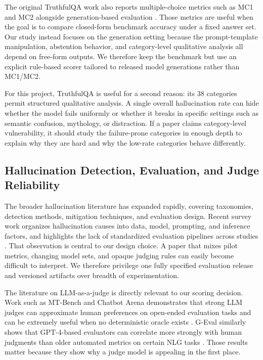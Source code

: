 \documentclass[conference]{IEEEtran}
\begin{document}
The original TruthfulQA work also reports multiple-choice metrics such as MC1 and MC2 alongside generation-based evaluation \cite{truthfulqa}. Those metrics are useful when the goal is to compare closed-form benchmark accuracy under a fixed answer set. Our study instead focuses on the generation setting because the prompt-template manipulation, abstention behavior, and category-level qualitative analysis all depend on free-form outputs. We therefore keep the benchmark but use an explicit rule-based scorer tailored to released model generations rather than MC1/MC2.

For this project, TruthfulQA is useful for a second reason: its 38 categories permit structured qualitative analysis. A single overall hallucination rate can hide whether the model fails uniformly or whether it breaks in specific settings such as semantic confusion, mythology, or distraction. If a paper claims category-level vulnerability, it should study the failure-prone categories in enough depth to explain why they are hard and why the low-rate categories behave differently.

\subsection{\textbf{Hallucination Detection, Evaluation, and Judge Reliability}}

The broader hallucination literature has expanded rapidly, covering taxonomies, detection methods, mitigation techniques, and evaluation design. Recent survey work organizes hallucination causes into data, model, prompting, and inference factors, and highlights the lack of standardized evaluation pipelines across studies \cite{hallucination_survey}. That observation is central to our design choice. A paper that mixes pilot metrics, changing model sets, and opaque judging rules can easily become difficult to interpret. We therefore privilege one fully specified evaluation release and versioned artifacts over breadth of experimentation.

The literature on LLM-as-a-judge is directly relevant to our scoring decision. Work such as MT-Bench and Chatbot Arena demonstrates that strong LLM judges can approximate human preferences on open-ended evaluation tasks and can be extremely useful when no deterministic oracle exists \cite{mtbench_judge}. G-Eval similarly shows that GPT-4-based evaluators can correlate more strongly with human judgments than older automated metrics on certain NLG tasks \cite{geval}. Those results matter because they show why a judge model is appealing in the first place.
\end{document}
